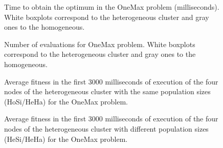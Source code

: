 \documentclass[final,1p,times]{elsarticle}
\begin{document}
\begin{figure}[htb]
\centering
{}
\caption{Time to obtain the optimum in the OneMax problem (milliseconds). White boxplots correspond to the heterogeneous cluster and gray ones to the homogeneous.}
\label{fig:timeOneMax}
\end{figure}

\begin{figure}[htb]
\centering
{}
\caption{Number of evaluations for OneMax problem. White boxplots correspond to the heterogeneous cluster and gray ones to the homogeneous.}
\label{fig:evalsOneMax}
\end{figure}

\begin{figure}[htb]
\centering
{}
\caption{Average fitness in the first 3000 milliseconds of execution of the four nodes of the heterogeneous cluster with the same population sizes (HoSi/HeHa) for the OneMax problem.}
\label{fig:gensonemaxhomosize}
\end{figure}

\begin{figure}[htb]
\centering
{}
\caption{Average fitness in the first 3000 milliseconds of execution of the four nodes of the heterogeneous cluster with different population sizes (HeSi/HeHa) for the OneMax problem.}
\label{fig:gensonemaxheterosize}
\end{figure}
\end{document}
